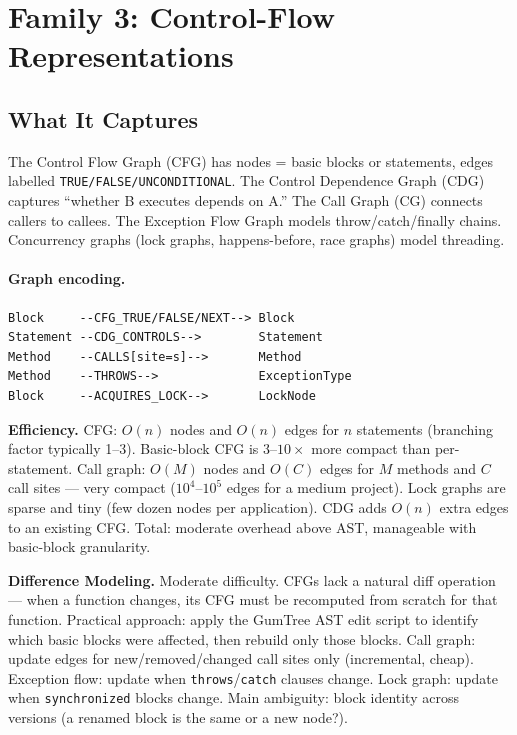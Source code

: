 \documentclass[12pt,a4paper]{article}
\begin{document}
\section{Family 3: Control-Flow Representations}

\subsection{What It Captures}

The Control Flow Graph (CFG) has nodes = basic blocks or statements, edges
labelled \texttt{TRUE/FALSE/UNCONDITIONAL}. The Control Dependence Graph (CDG)
captures ``whether B executes depends on A.'' The Call Graph (CG) connects
callers to callees. The Exception Flow Graph models throw/catch/finally chains.
Concurrency graphs (lock graphs, happens-before, race graphs) model threading.

\paragraph{Graph encoding.}
\begin{lstlisting}
Block     --CFG_TRUE/FALSE/NEXT--> Block
Statement --CDG_CONTROLS-->        Statement
Method    --CALLS[site=s]-->       Method
Method    --THROWS-->              ExceptionType
Block     --ACQUIRES_LOCK-->       LockNode
\end{lstlisting}

\begin{effbox}
\textbf{Efficiency.}
CFG: $O(n)$ nodes and $O(n)$ edges for $n$ statements (branching factor
typically 1--3). Basic-block CFG is $3$--$10\times$ more compact than
per-statement. Call graph: $O(M)$ nodes and $O(C)$ edges for $M$ methods and
$C$ call sites --- very compact ($10^4$--$10^5$ edges for a medium project).
Lock graphs are sparse and tiny (few dozen nodes per application). CDG adds
$O(n)$ extra edges to an existing CFG. Total: moderate overhead above AST,
manageable with basic-block granularity.
\end{effbox}

\begin{diffbox}
\textbf{Difference Modeling.}
Moderate difficulty. CFGs lack a natural diff operation --- when a function
changes, its CFG must be recomputed from scratch for that function. Practical
approach: apply the GumTree AST edit script to identify which basic blocks
were affected, then rebuild only those blocks. Call graph: update edges for
new/removed/changed call sites only (incremental, cheap). Exception flow: update
when \texttt{throws}/\texttt{catch} clauses change. Lock graph: update when
\texttt{synchronized} blocks change. Main ambiguity: block identity across
versions (a renamed block is the same or a new node?).
\end{diffbox}
\end{document}
